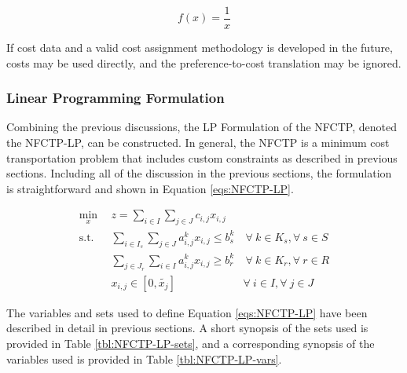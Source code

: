 \begin{equation}
f(x) = \frac{1}{x}
\end{equation}

If cost data and a valid cost assignment methodology is developed in the future,
costs may be used directly, and the preference-to-cost translation may be
ignored.

\subsubsection{Linear Programming Formulation}\label{abm:dre:lp}

Combining the previous discussions, the LP Formulation of the NFCTP, denoted the
NFCTP-LP, can be constructed. In general, the NFCTP is a minimum cost
transportation problem that includes custom constraints as described in previous
sections. Including all of the discussion in the previous sections, the
formulation is straightforward and shown in Equation \ref{eqs:NFCTP-LP}.

\begin{subequations}\label{eqs:NFCTP-LP}
  \begin{align}
    \min_{x} \:\: 
    & 
    z = \sum_{i \in I}\sum_{j \in J}c_{i,j} x_{i,j} 
    & 
    \label{eqs:NFCTP-LP_obj} \\
    \text{s.t.} \:\: 
    &
    \sum_{i \in I_s} \sum_{j \in J} a^k_{i,j} x_{i,j} \leq b^k_s 
    &
    \: 
    \forall \: k \in K_s, 
    \forall \: s \in S 
    \label{eqs:NFCTP-LP_sup} \\
    &
    \sum_{j \in J_r} \sum_{i \in I} a^k_{i,j} x_{i,j} \geq b^k_r 
    &
    \: 
    \forall \: k \in K_r,  
    \forall \: r \in R 
    \label{eqs:NFCTP-LP_req} \\
    &
    x_{i,j} \in [0, \tilde{x_j}]
    &
    \forall \: i \in I, 
    \forall \: j \in J 
    \label{eqs:NFCTP-LP_x}
  \end{align}
\end{subequations}

The variables and sets used to define Equation \ref{eqs:NFCTP-LP} have been
described in detail in previous sections. A short synopsis of the sets used is
provided in Table \ref{tbl:NFCTP-LP-sets}, and a corresponding synopsis of the
variables used is provided in Table \ref{tbl:NFCTP-LP-vars}.

